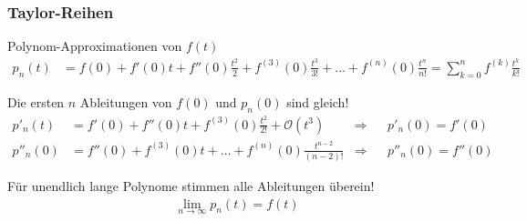 \begin{frame}[t]
\setlength{\abovedisplayskip}{5pt}
\setlength{\belowdisplayskip}{5pt}
\frametitle{Taylor-Reihen}
\vspace{-20pt}
\onslide<+->
  \begin{block}{Polynom-Approximationen von $f(t)$}
    \vspace{-15pt}
    \begin{align*}
      p_n(t) 
      &=
      f(0) 
      + f'(0) t 
      + f''(0)\frac{t^2}{2} 
      + f^{(3)}(0)\frac{t^3}{3!} 
      + \ldots 
      + f^{(n)}(0) \frac{t^n}{n!}
      =
      \sum_{k=0}^{n} f^{(k)} \frac{t^k}{k!}
    \end{align*}
  \end{block}
  \begin{block}{Die ersten $n$ Ableitungen von $f(0)$ und $p_n(0)$ sind gleich!}
    \vspace{-15pt}
    \begin{align*}
      p'_n(t)
      &=
      f'(0) 
      + f''(0)t 
      + f^{(3)}(0) \frac{t^2}{2!}
      + \mathcal O(t^3)
      &\Rightarrow&&
      p'_n(0) = f'(0)
      \\
      p''_n(0)
      &=
      f''(0) + f^{(3)}(0)t + \ldots + f^{(n)}(0) \frac{t^{n-2}}{(n-2)!}
      &\Rightarrow&&
      p''_n(0) = f''(0)
    \end{align*}
  \end{block}
  \begin{block}{Für unendlich lange Polynome stimmen alle Ableitungen überein!}
    \vspace{-15pt}
    \begin{align*}
      \lim_{n\to \infty} p_n(t)
      =
      f(t)
    \end{align*}
  \end{block}
\end{frame}


